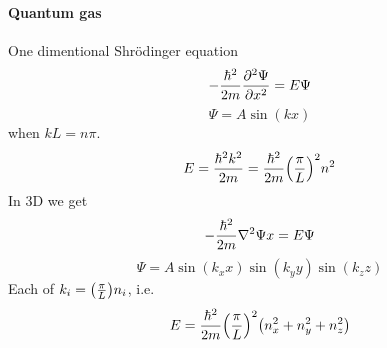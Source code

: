 \paragraph{Quantum gas}
One dimentional Shr\"{o}dinger equation
$$-\frac{\hbar^2}{2m} \pdv[2]{\Psi}{x} = E\Psi$$
$$\Psi = A\sin(kx)$$
when $kL = n\pi$.
$$E = \frac{\hbar^2 k^2}{2m} = \frac{\hbar^2}{2m} \qty(\frac{\pi}{L})^2n^2$$
In 3D we get
$$-\frac{\hbar^2}{2m} \laplacian{\Psi}{x} = E\Psi$$
$$\Psi = A\sin(k_xx)\sin(k_yy)\sin(k_zz)$$
Each of $k_i = \qty(\frac{\pi}{L})n_i$, i.e.
$$E = \frac{\hbar^2}{2m} \qty(\frac{\pi}{L})^2\qty(n_x^2+n_y^2+n_z^2)$$